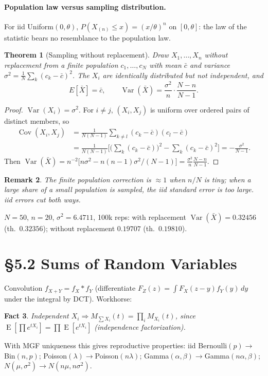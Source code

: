 \documentclass[11pt]{article}
\newtheorem{theorem}{Theorem}[section]
\newtheorem{remark}[theorem]{Remark}
\newtheorem{fact}[theorem]{Fact}
\DeclareMathOperator{\Var}{Var}\DeclareMathOperator{\Cov}{Cov}\DeclareMathOperator{\E}{E}
\begin{document}
\paragraph{Population law versus sampling distribution.} For iid Uniform$(0,\theta)$, $P(X_{(n)}\le x)=(x/\theta)^n$ on $[0,\theta]$: the law of the statistic bears no resemblance to the population law.
\begin{theorem}[Sampling without replacement]
Draw $X_1,\dots,X_n$ without replacement from a finite population $c_1,\dots,c_N$ with mean $\bar c$ and variance $\sigma^2=\frac1N\sum_k(c_k-\bar c)^2$. The $X_i$ are identically distributed but not independent, and
\[E[\bar X]=\bar c,\qquad \Var(\bar X)=\frac{\sigma^2}{n}\cdot\frac{N-n}{N-1}.\]
\end{theorem}
\begin{proof}
$\Var(X_i)=\sigma^2$. For $i\ne j$, $(X_i,X_j)$ is uniform over ordered pairs of distinct members, so
\begin{align*}
\Cov(X_i,X_j)&=\frac{1}{N(N-1)}\sum_{k\ne l}(c_k-\bar c)(c_l-\bar c)\\
&=\frac{1}{N(N-1)}\Big[\Big(\sum_k(c_k-\bar c)\Big)^2-\sum_k(c_k-\bar c)^2\Big]=-\frac{\sigma^2}{N-1}.
\end{align*}
Then $\Var(\bar X)=n^{-2}\big[n\sigma^2-n(n-1)\sigma^2/(N-1)\big]=\frac{\sigma^2}{n}\frac{N-n}{N-1}$.
\end{proof}
\begin{remark}
The finite population correction is $\approx1$ when $n/N$ is tiny; when a large share of a small population is sampled, the iid standard error is too large. iid errors cut both ways.
\end{remark}
\begin{simbox}
$N=50$, $n=20$, $\sigma^2=6.4711$, 100k reps: with replacement $\Var(\bar X)=0.32456$ (th.\ $0.32356$); without replacement $0.19707$ (th.\ $0.19810$).
\end{simbox}

\section{\S5.2 Sums of Random Variables}
Convolution $f_{X+Y}=f_X*f_Y$ (differentiate $F_Z(z)=\int F_X(z-y)f_Y(y)\,dy$ under the integral by DCT). Workhorse:
\begin{fact}
Independent $X_i\Rightarrow M_{\sum X_i}(t)=\prod_i M_{X_i}(t)$, since $\E[\prod e^{tX_i}]=\prod\E[e^{tX_i}]$ (independence factorization).
\end{fact}
With MGF uniqueness this gives reproductive properties: iid Bernoulli$(p)\to$Bin$(n,p)$; Poisson$(\lambda)\to$Poisson$(n\lambda)$; Gamma$(\alpha,\beta)\to$Gamma$(n\alpha,\beta)$; $N(\mu,\sigma^2)\to N(n\mu,n\sigma^2)$.
\end{document}
